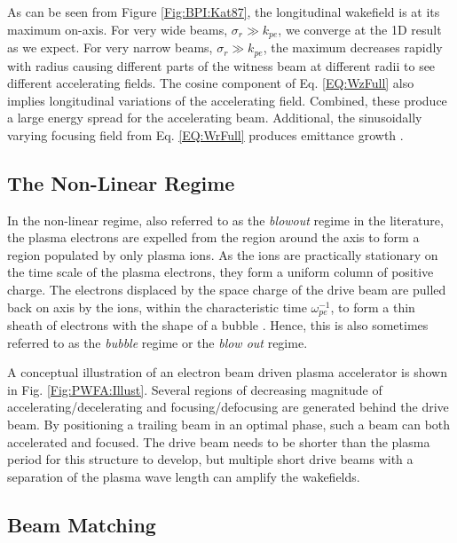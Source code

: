 As can be seen from Figure \ref{Fig:BPI:Kat87}, the longitudinal wakefield is at its maximum on-axis. For very wide beams, $\sigma_{r} \gg k_{pe}$, we converge at the 1D result as we expect. For very narrow beams, $\sigma_{r} \gg k_{pe}$, the maximum decreases rapidly with radius causing different parts of the witness beam at different radii to see different accelerating fields. The cosine component of Eq. \ref{EQ:WzFull} also implies longitudinal variations of the accelerating field. Combined, these produce a large energy spread for the accelerating beam. Additional, the sinusoidally varying focusing field from Eq. \ref{EQ:WrFull} produces emittance growth \cite{muggli:2017,katsouleas:1987}.


\subsection{The Non-Linear Regime}
\label{Int:BPI:NLin}

In the non-linear regime, also referred to as the \textit{blowout} regime in the literature, the plasma electrons are expelled from the region around the axis to form a region populated by only plasma ions. As the ions are practically stationary on the time scale of the plasma electrons, they form a uniform column of positive charge. The electrons displaced by the space charge of the drive beam are pulled back on axis by the ions, within the characteristic time $\omega_{pe}^{-1}$, to form a thin sheath of electrons with the shape of a bubble \cite{lu:2006a,lu:2006}. Hence, this is also sometimes referred to as the \textit{bubble} regime or the \textit{blow out} regime.

A conceptual illustration of an electron beam driven plasma accelerator is shown in Fig. \ref{Fig:PWFA:Illust}. Several regions of decreasing magnitude of accelerating/decelerating and focusing/defocusing are generated behind the drive beam. By positioning a trailing beam in an optimal phase, such a beam can both accelerated and focused. The drive beam needs to be shorter than the plasma period for this structure to develop, but multiple short drive beams with a separation of the plasma wave length can amplify the wakefields.

\subsection{Beam Matching}
\label{Sim:Match}

